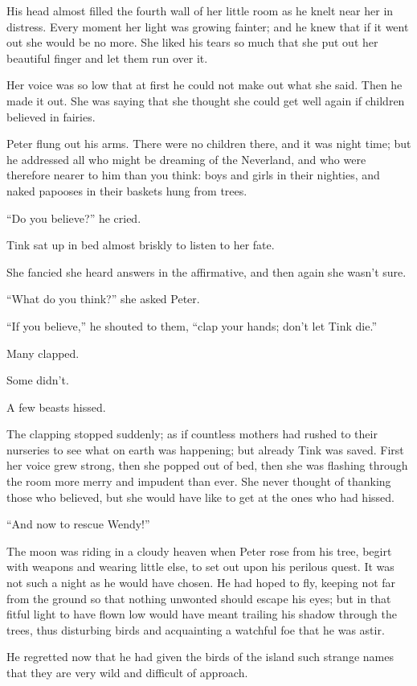 His head almost filled the fourth wall of her little room as he knelt near her in distress.
Every moment her light was growing fainter;
and he knew that if it went out she would be no more.
She liked his tears so much that she put out her beautiful finger and let them run over it.

Her voice was so low that at first he could not make out what she said.
Then he made it out.
She was saying that she thought she could get well again if children believed in fairies.

Peter flung out his arms.
There were no children there, and it was night time;
but he addressed all who might be dreaming of the Neverland,
and who were therefore nearer to him than you think:
boys and girls in their nighties,
and naked papooses in their baskets hung from trees.

“Do you believe?\@” he cried.

Tink sat up in bed almost briskly to listen to her fate.

She fancied she heard answers in the affirmative, and then again she wasn’t sure.

“What do you think?\@” she asked Peter.

“If you believe,” he shouted to them, “clap your hands;
don’t let Tink die.”

Many clapped.

Some didn’t.

A few beasts hissed.

The clapping stopped suddenly;
as if countless mothers had rushed to their nurseries to see what on earth was happening;
but already Tink was saved.
First her voice grew strong, then she popped out of bed,
then she was flashing through the room more merry and impudent than ever.
She never thought of thanking those who believed,
but she would have like to get at the ones who had hissed.

“And now to rescue Wendy!”

The moon was riding in a cloudy heaven when Peter rose from his tree,
begirt with weapons and wearing little else, to set out upon his perilous quest.
It was not such a night as he would have chosen.
He had hoped to fly, keeping not far from the ground so that nothing unwonted should escape his eyes;
but in that fitful light to have flown low would have meant trailing his shadow through the trees,
thus disturbing birds and acquainting a watchful foe that he was astir.

He regretted now that he had given the birds of the island such strange names
that they are very wild and difficult of approach.

